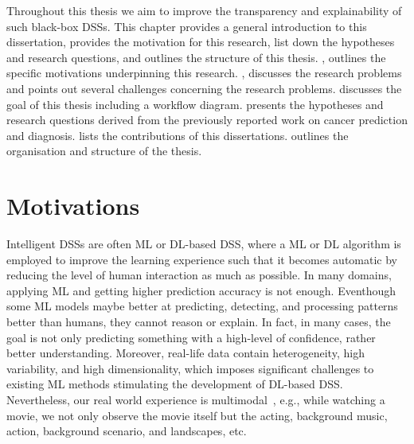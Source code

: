 \hspace*{3.5mm} Throughout this thesis we aim to improve the transparency and explainability of such black-box DSSs. This chapter provides a general introduction to this dissertation, provides the motivation for this research, list down the hypotheses and research questions, and outlines the structure of this thesis. 
, outlines the specific motivations underpinning this research. , discusses the research problems and points out several challenges concerning the research problems.  discusses the goal of this thesis including a workflow diagram.  presents the hypotheses and research questions derived from the previously reported work on cancer prediction and diagnosis.  lists the contributions of this dissertations.  outlines the organisation and structure of the thesis.


\section{Motivations}\label{motivations}
Intelligent DSSs are often ML or DL-based DSS, where a ML or DL algorithm is employed to improve the learning experience such that it becomes automatic by reducing the level of human interaction as much as possible. In many domains, applying ML and getting higher prediction accuracy is not enough. Eventhough some ML models maybe better at predicting, detecting, and processing patterns better than humans, they cannot reason or explain. In fact, in many cases, the goal is not only predicting something with a high-level of confidence, rather better understanding. Moreover, real-life data contain heterogeneity, high variability, and high dimensionality, which imposes significant challenges to existing ML methods stimulating the development of DL-based DSS. Nevertheless, our real world experience is multimodal~\cite{mmsurvey}, e.g., while watching a movie, we not only observe the movie itself but the acting, background music, action, background scenario, and landscapes, etc. 

